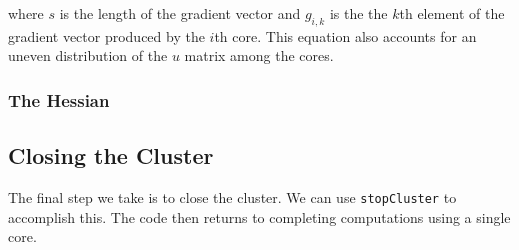 \documentclass{article}
\begin{document}
\noindent where $s$ is the length of the gradient vector and $g_{i,k}$ is the the $k$th element of the gradient vector produced by the $i$th core. This equation also accounts for an uneven distribution of the $u$ matrix among the cores.

\subsubsection{The Hessian}


\subsection{Closing the Cluster}
The final step we take is to close the cluster. We can use \texttt{stopCluster} to accomplish this. The code then returns to completing computations using a single core. 
\end{document}
